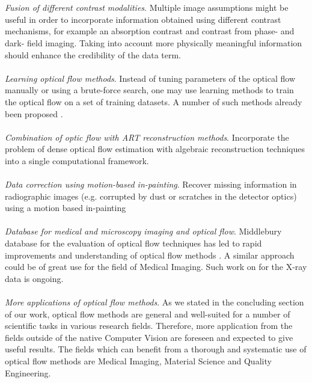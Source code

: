 \\
\\
\textit{Fusion of different contrast modalities}. Multiple image assumptions might be useful in order to incorporate information obtained using different contrast mechanisms, for example an absorption contrast and contrast from phase- and dark- field imaging. Taking into account more physically meaningful information should enhance the credibility of the data term.
\\
\\   
\textit{Learning optical flow methods}. Instead of tuning parameters of the optical flow manually or using a brute-force search, one may use learning methods to train the optical flow on a set of training datasets. A number of such methods already been proposed \cite{Sun08}.
\\
\\  
\textit{Combination of optic flow with ART reconstruction methods}. Incorporate the problem of dense optical flow estimation with algebraic reconstruction techniques \cite{Gordon70} into a single computational framework. 
\\
\\   
\textit{Data correction using motion-based in-painting}. Recover missing information in radiographic images (e.g. corrupted by dust or scratches in the detector optics) using a motion based in-painting \cite{Werlberger11}
\\
\\  
\textit{Database for medical and microscopy imaging and optical flow}. Middlebury database for the evaluation of optical flow techniques has led to rapid improvements and understanding of optical flow methods \cite{Middl}. A similar approach could be of great use for the field of Medical Imaging.     Such work on for the X-ray data is ongoing.
\\
\\  
\textit{More applications of optical flow methods}. As we stated in the concluding section of our work, optical flow methods are general and well-suited for a number of scientific tasks in various research fields. Therefore, more application from the fields outside of the native Computer Vision are foreseen and expected to give useful results. The fields which can benefit from a thorough and systematic use of optical flow methods are Medical Imaging, Material Science and Quality Engineering. 


